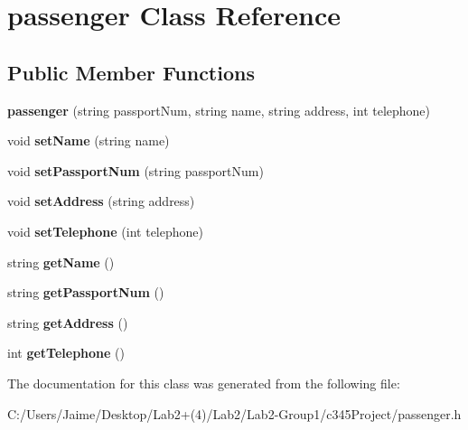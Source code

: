 \hypertarget{classpassenger}{
\section{passenger Class Reference}
\label{classpassenger}
}
\subsection*{Public Member Functions}
\begin{DoxyCompactItemize}
\item 
\hypertarget{classpassenger_a0cbe2126fac4a6cb29b880dd4dfb0525}{
{\bfseries passenger} (string passportNum, string name, string address, int telephone)}
\label{classpassenger_a0cbe2126fac4a6cb29b880dd4dfb0525}

\item 
\hypertarget{classpassenger_a073ced310d6066a810a1b99612c9d738}{
void {\bfseries setName} (string name)}
\label{classpassenger_a073ced310d6066a810a1b99612c9d738}

\item 
\hypertarget{classpassenger_abbbb42bf87523a5f7e45d74e9d848167}{
void {\bfseries setPassportNum} (string passportNum)}
\label{classpassenger_abbbb42bf87523a5f7e45d74e9d848167}

\item 
\hypertarget{classpassenger_a53d815abb6238763f0f618af834a5393}{
void {\bfseries setAddress} (string address)}
\label{classpassenger_a53d815abb6238763f0f618af834a5393}

\item 
\hypertarget{classpassenger_ae6cef75737ea749c28f667d0c1b705f5}{
void {\bfseries setTelephone} (int telephone)}
\label{classpassenger_ae6cef75737ea749c28f667d0c1b705f5}

\item 
\hypertarget{classpassenger_ab21a1408f3b7d1df5cc8ad4b02f36fd5}{
string {\bfseries getName} ()}
\label{classpassenger_ab21a1408f3b7d1df5cc8ad4b02f36fd5}

\item 
\hypertarget{classpassenger_afc9c1e8c7c45713668f0d02fcfb5978b}{
string {\bfseries getPassportNum} ()}
\label{classpassenger_afc9c1e8c7c45713668f0d02fcfb5978b}

\item 
\hypertarget{classpassenger_aff4b927926f980e2d73695f6f44f9c10}{
string {\bfseries getAddress} ()}
\label{classpassenger_aff4b927926f980e2d73695f6f44f9c10}

\item 
\hypertarget{classpassenger_af68af923ad150da3bb633dec52d8f96b}{
int {\bfseries getTelephone} ()}
\label{classpassenger_af68af923ad150da3bb633dec52d8f96b}

\end{DoxyCompactItemize}


The documentation for this class was generated from the following file:\begin{DoxyCompactItemize}
\item 
C:/Users/Jaime/Desktop/Lab2+(4)/Lab2/Lab2-\/Group1/c345Project/passenger.h\end{DoxyCompactItemize}

